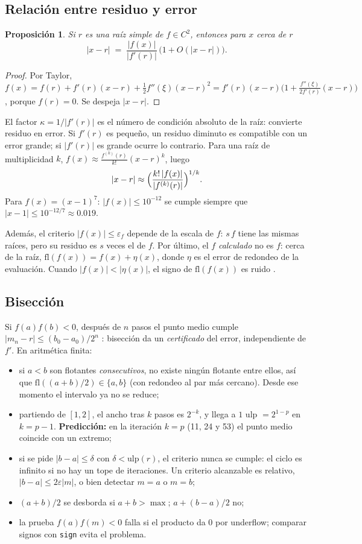 \documentclass[11pt]{article}
\newtheorem{prop}{Proposición}
\begin{document}
\subsection{Relación entre residuo y error}
\begin{prop}
Si $r$ es una raíz simple de $f\in C^2$, entonces para $x$ cerca de $r$
\[
|x-r| \;=\; \frac{|f(x)|}{|f'(r)|}\,\bigl(1+O(|x-r|)\bigr).
\]
\end{prop}
\begin{proof}
Por Taylor, $f(x)=f(r)+f'(r)(x-r)+\tfrac12 f''(\xi)(x-r)^2=f'(r)(x-r)\bigl(1+\tfrac{f''(\xi)}{2f'(r)}(x-r)\bigr)$, porque $f(r)=0$. Se despeja $|x-r|$.
\end{proof}
El factor $\kappa=1/|f'(r)|$ es el número de condición absoluto de la raíz: convierte residuo en error. Si $f'(r)$ es pequeño, un residuo diminuto es compatible con un error grande; si $|f'(r)|$ es grande ocurre lo contrario. Para una raíz de multiplicidad $k$, $f(x)\approx \frac{f^{(k)}(r)}{k!}(x-r)^k$, luego
\[
|x-r|\approx\Bigl(\frac{k!\,|f(x)|}{|f^{(k)}(r)|}\Bigr)^{1/k}.
\]
Para $f(x)=(x-1)^7$: $|f(x)|\le 10^{-12}$ se cumple siempre que $|x-1|\le 10^{-12/7}\approx 0.019$.

Además, el criterio $|f(x)|\le\varepsilon_f$ depende de la escala de $f$: $s\,f$ tiene las mismas raíces, pero su residuo es $s$ veces el de $f$. Por último, el $f$ \emph{calculado} no es $f$: cerca de la raíz, $\mathrm{fl}(f(x))=f(x)+\eta(x)$, donde $\eta$ es el error de redondeo de la evaluación. Cuando $|f(x)|<|\eta(x)|$, el signo de $\mathrm{fl}(f(x))$ es ruido \cite{higham}.

\subsection{Bisección}
Si $f(a)f(b)<0$, después de $n$ pasos el punto medio cumple $|m_n-r|\le (b_0-a_0)/2^{n}$ \cite{cheney}: bisección da un \emph{certificado} del error, independiente de $f'$. En aritmética finita:
\begin{itemize}
\item si $a<b$ son flotantes \emph{consecutivos}, no existe ningún flotante entre ellos, así que $\mathrm{fl}((a+b)/2)\in\{a,b\}$ (con redondeo al par más cercano). Desde ese momento el intervalo ya no se reduce;
\item partiendo de $[1,2]$, el ancho tras $k$ pasos es $2^{-k}$, y llega a $1$ ulp $=2^{1-p}$ en $k=p-1$. \textbf{Predicción:} en la iteración $k=p$ (11, 24 y 53) el punto medio coincide con un extremo;
\item si se pide $|b-a|\le\delta$ con $\delta<\mathrm{ulp}(r)$, el criterio nunca se cumple: el ciclo es infinito si no hay un tope de iteraciones. Un criterio alcanzable es relativo, $|b-a|\le 2\varepsilon|m|$, o bien detectar $m=a$ o $m=b$;
\item $(a+b)/2$ se desborda si $a+b>\max$; $a+(b-a)/2$ no;
\item la prueba $f(a)f(m)<0$ falla si el producto da $0$ por underflow; comparar signos con \texttt{sign} evita el problema.
\end{itemize}
\end{document}
